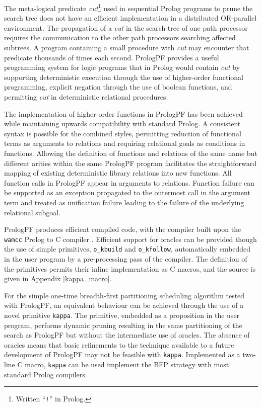 The meta-logical predicate \textit{cut}\footnote{Written ``\texttt{!}'' in Prolog.}
 used in sequential Prolog programs to
prune the search tree does not have an efficient implementation in a
distributed OR-parallel environment.  The propagation of a \textit{cut} in the search
tree of one path processor requires the communication to the other path
processors searching affected subtrees.  A program containing a small procedure
with \textit{cut} may encounter that predicate thousands of times each second.
PrologPF provides a useful programming system for logic programs that in Prolog
would contain \textit{cut} by supporting deterministic execution through the
use of higher-order functional programming, explicit negation through the use
of boolean functions, and permitting \textit{cut} in deterministic relational
procedures.

The implementation of higher-order functions in PrologPF has been achieved while
maintaining upwards compatibility with standard Prolog.  A consistent syntax is
possible for the combined styles, permitting reduction of functional terms as
arguments to relations and requiring relational goals as conditions in functions.
Allowing the definition of functions and relations of the same name but different arities
within the same PrologPF program facilitates the straightforward mapping of existing
deterministic library relations into new functions.  All function calls in PrologPF
appear in arguments to relations. Function failure can be supported as an exception
propagated to the outermost call in the argument term and
treated as unification failure leading to the failure of the underlying relational
subgoal.

PrologPF produces efficient compiled code, with the compiler built upon the
\texttt{wamcc} Prolog to C compiler \cite{CD95}.  Efficient support for
oracles can be provided though the use of simple primitives, \texttt{o\_{}kbuild}
and \texttt{o\_{}kfollow}, automatically embedded in the user program
by a pre-processing pass of the compiler.  The definition of the
primitives permits their inline implementation as C macros, and the source is
given in Appendix \ref{kappa_macro}.

For the simple one-time breadth-first partitioning scheduling algorithm tested with
PrologPF, an equivalent behaviour can be achieved through the use of a novel primitive
\texttt{kappa}.  The primitive, embedded as a proposition in the user program, performs
dynamic pruning resulting in the same partitioning of the search as PrologPF but without
the intermediate use of oracles.  The absence of oracles means that basic refinements
to the technique available to a future development of PrologPF may not be feasible with
\texttt{kappa}.  Implemented as a two-line C macro, \texttt{kappa} can be used implement
the BFP strategy with
most standard Prolog compilers.


